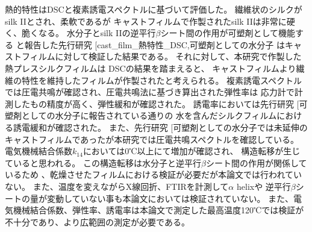 \documentclass[dvipdfmx,12pt,a4paper]{jreport}
\makeatletter
\DeclareRobustCommand\cite{\unskip
    	\@ifnextchar[{\@tempswatrue\@citex}{\@tempswafalse\@citex[]}}
\makeatother
\begin{document}
	熱的特性はDSCと複素誘電スペクトルに基づいて評価した。
	繊維状のシルクがsilk IIとされ、柔軟であるが
	キャストフィルムで作製されたsilk IIは非常に硬く、脆くなる。
	水分子とsilk IIの逆平行$\beta$シート間の作用が可塑剤として機能する
	と報告した先行研究\cite{cast_film_熱特性_DSC,可塑剤としての水分子}
	はキャストフィルムに対して検証した結果である。
	それに対して、本研究で作製した熱プレスシルクフィルムは
	DSCの結果を踏まえると、
	キャストフィルムより繊維の特性を維持したフィルムが作製されたと考えられる。
	複素誘電スペクトルでは圧電共鳴が確認され、圧電共鳴法に基づき算出された弾性率は
	応力計で計測したもの精度が高く、弾性緩和が確認された。
	誘電率においては先行研究\cite{可塑剤としての水分子}に報告されている通りの
	水を含んだシルクフィルムにおける誘電緩和が確認された。
	また、先行研究\cite{可塑剤としての水分子}では未延伸の
	キャストフィルムであったが本研究では圧電共鳴スペクトルを確認している。
	電気機械結合係数$k_{14}$においては0℃以上にて増加が確認され、
	構造転移が生じていると思われる。
	この構造転移は水分子と逆平行$\beta$シート間の作用が関係しているため
	、乾燥させたフィルムにおける検証が必要だが本論文では行われていない。
	また、温度を変えながらX線回折、FTIRを計測して$\alpha$ helixや
	逆平行$\beta$シートの量が変動していない事も本論文においては検証されていない。
	また、電気機械結合係数、弾性率、誘電率は本論文で測定した最高温度120℃では検証が
	不十分であり、より広範囲の測定が必要である。
\end{document}
